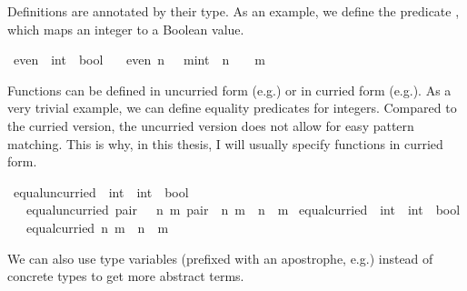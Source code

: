 \begin{isabellebody}
\begin{isamarkuptext}
Definitions are annotated by their type. As an example, we define the predicate , which maps an integer to a Boolean value.%
\end{isamarkuptext}\isamarkuptrue%
\isamarkupfalse%
\ even\ {\isacharcolon}{\kern0pt}{\isacharcolon}{\kern0pt}\ {\isacartoucheopen}int\ {\isasymRightarrow}\ bool{\isacartoucheclose}\isanewline
\ \ \ {\isacartoucheopen}even\ n\ {\isasymequiv}\ {\isasymexists}\ m{\isacharcolon}{\kern0pt}{\isacharcolon}{\kern0pt}int\ {\isachardot}{\kern0pt}\ n\ {\isacharequal}{\kern0pt}\ {}\ {\isacharasterisk}{\kern0pt}\ m{\isacartoucheclose}%
\begin{isamarkuptext}%
Functions can be defined in uncurried form (e.g.\@ {}) or in curried form (e.g.\@ {}). As a very trivial example, we can define equality predicates for integers. Compared to the curried version, the uncurried version does not allow for easy pattern matching. This is why, in this thesis, I will usually specify functions in curried form.%
\end{isamarkuptext}\isamarkuptrue%
\isamarkupfalse%
\ equal{\isacharunderscore}{\kern0pt}uncurried\ {\isacharcolon}{\kern0pt}{\isacharcolon}{\kern0pt}\ {\isacartoucheopen}{\isacharparenleft}{\kern0pt}int\ {\isasymtimes}\ int{\isacharparenright}{\kern0pt}\ {\isasymRightarrow}\ bool{\isacartoucheclose}\isanewline
\ \ \ {\isacartoucheopen}equal{\isacharunderscore}{\kern0pt}uncurried\ pair\ {\isasymequiv}\ {\isasymexists}\ n\ m{\isachardot}{\kern0pt}\ pair\ {\isacharequal}{\kern0pt}\ {\isacharparenleft}{\kern0pt}n{\isacharcomma}{\kern0pt}\ m{\isacharparenright}{\kern0pt}\ {\isasymand}\ n\ {\isacharequal}{\kern0pt}\ m{\isacartoucheclose}\isanewline
\isanewline
{}\isamarkupfalse%
\ equal{\isacharunderscore}{\kern0pt}curried\ {\isacharcolon}{\kern0pt}{\isacharcolon}{\kern0pt}\ {\isacartoucheopen}int\ {\isasymRightarrow}\ int\ {\isasymRightarrow}\ bool{\isacartoucheclose}\isanewline
\ \ \ {\isacartoucheopen}equal{\isacharunderscore}{\kern0pt}curried\ n\ m\ {\isasymequiv}\ n\ {\isacharequal}{\kern0pt}\ m{\isacartoucheclose}%
\begin{isamarkuptext}%
We can also use type variables (prefixed with an apostrophe, e.g.\@ {}) instead of concrete types to get more abstract terms.%

\end{isamarkuptext}
\end{isabellebody}
